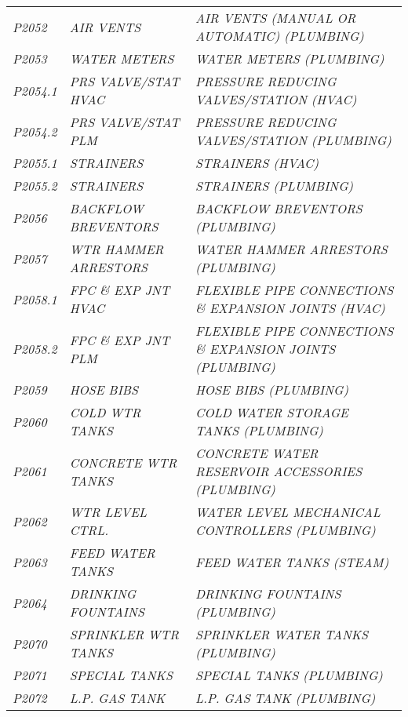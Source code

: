 \begin{landscape}
\begin{longtable}[l]{l%
                  l|%
                  l|}
\itshape P2052       &\itshape AIR VENTS   &\itshape AIR VENTS (MANUAL OR AUTOMATIC) (PLUMBING)   \\
\itshape P2053       &\itshape WATER METERS   &\itshape WATER METERS (PLUMBING)   \\
\itshape P2054.1     &\itshape PRS VALVE/STAT HVAC   &\itshape PRESSURE REDUCING VALVES/STATION (HVAC)   \\
\itshape P2054.2     &\itshape PRS VALVE/STAT PLM   &\itshape PRESSURE REDUCING VALVES/STATION (PLUMBING)   \\
\itshape P2055.1     &\itshape STRAINERS   &\itshape STRAINERS (HVAC)   \\
\itshape P2055.2     &\itshape STRAINERS   &\itshape STRAINERS (PLUMBING)   \\
\itshape P2056       &\itshape BACKFLOW BREVENTORS   &\itshape BACKFLOW BREVENTORS (PLUMBING)   \\
\itshape P2057       &\itshape WTR HAMMER ARRESTORS   &\itshape WATER HAMMER ARRESTORS (PLUMBING)   \\
\itshape P2058.1     &\itshape FPC \& EXP JNT HVAC   &\itshape FLEXIBLE PIPE CONNECTIONS \& EXPANSION JOINTS (HVAC)   \\
\itshape P2058.2     &\itshape FPC \& EXP JNT PLM   &\itshape FLEXIBLE PIPE CONNECTIONS \& EXPANSION JOINTS (PLUMBING)   \\
\itshape P2059       &\itshape HOSE BIBS   &\itshape HOSE BIBS (PLUMBING)   \\
\itshape P2060       &\itshape COLD WTR TANKS   &\itshape COLD WATER STORAGE TANKS (PLUMBING)   \\
\itshape P2061       &\itshape CONCRETE WTR TANKS   &\itshape CONCRETE WATER RESERVOIR ACCESSORIES (PLUMBING)   \\
\itshape P2062       &\itshape WTR LEVEL CTRL.   &\itshape WATER LEVEL MECHANICAL CONTROLLERS (PLUMBING)   \\
\itshape P2063       &\itshape FEED WATER TANKS   &\itshape FEED WATER TANKS (STEAM)   \\
\itshape P2064       &\itshape DRINKING FOUNTAINS   &\itshape DRINKING FOUNTAINS (PLUMBING)   \\
\itshape P2070       &\itshape SPRINKLER WTR TANKS   &\itshape SPRINKLER WATER TANKS (PLUMBING)   \\
\itshape P2071       &\itshape SPECIAL TANKS   &\itshape SPECIAL TANKS (PLUMBING)   \\
\itshape P2072       &\itshape L.P. GAS TANK   &\itshape L.P. GAS TANK (PLUMBING)   \\

\end{longtable}
\end{landscape}
